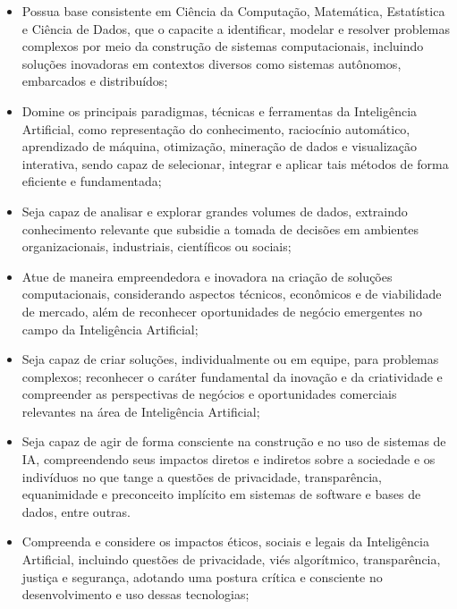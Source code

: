 \begin{itemize}

    \item Possua base consistente em Ciência da Computação, Matemática, Estatística e Ciência de Dados, que o capacite a identificar, modelar e resolver problemas complexos por meio da construção de sistemas computacionais, incluindo soluções inovadoras em contextos diversos como sistemas autônomos, embarcados e distribuídos;

    \item Domine os principais paradigmas, técnicas e ferramentas da Inteligência Artificial, como representação do conhecimento, raciocínio automático, aprendizado de máquina, otimização, mineração de dados e visualização interativa, sendo capaz de selecionar, integrar e aplicar tais métodos de forma eficiente e fundamentada;

    \item Seja capaz de analisar e explorar grandes volumes de dados, extraindo conhecimento relevante que subsidie a tomada de decisões em ambientes organizacionais, industriais, científicos ou sociais;
    
    \item Atue de maneira empreendedora e inovadora na criação de soluções computacionais, considerando aspectos técnicos, econômicos e de viabilidade de mercado, além de reconhecer oportunidades de negócio emergentes no campo da Inteligência Artificial;
    
    \item Seja capaz de criar soluções, individualmente ou em equipe, para problemas complexos; reconhecer o caráter fundamental da inovação e da criatividade e compreender as perspectivas de negócios e oportunidades comerciais relevantes na área de Inteligência Artificial;

    \item Seja capaz de agir de forma consciente na construção e no uso de sistemas de IA, compreendendo seus impactos diretos e indiretos sobre a sociedade e os indivíduos no que tange a questões de privacidade, transparência, equanimidade e preconceito implícito em sistemas de software e bases de dados, entre outras.
    
    \item Compreenda e considere os impactos éticos, sociais e legais da Inteligência Artificial, incluindo questões de privacidade, viés algorítmico, transparência, justiça e segurança, adotando uma postura crítica e consciente no desenvolvimento e uso dessas tecnologias;
    

\end{itemize}
